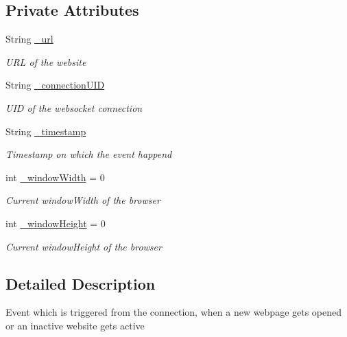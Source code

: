 \subsection*{Private Attributes}
\begin{DoxyCompactItemize}
\item 
String \hyperlink{class_web_analyzer_1_1_events_1_1_add_webpage_event_a514a144e2cc984ecec6593547732c55f}{\+\_\+url}
\begin{DoxyCompactList}\small\item\em U\+R\+L of the website \end{DoxyCompactList}\item 
String \hyperlink{class_web_analyzer_1_1_events_1_1_add_webpage_event_a20bc73ad665fa032bc1d2e7f6d34db17}{\+\_\+connection\+U\+I\+D}
\begin{DoxyCompactList}\small\item\em U\+I\+D of the websocket connection \end{DoxyCompactList}\item 
String \hyperlink{class_web_analyzer_1_1_events_1_1_add_webpage_event_a6e60058cdea0a0ac86687e1a50eae2ed}{\+\_\+timestamp}
\begin{DoxyCompactList}\small\item\em Timestamp on which the event happend \end{DoxyCompactList}\item 
int \hyperlink{class_web_analyzer_1_1_events_1_1_add_webpage_event_a81172683920ef969d84914baff51a87b}{\+\_\+window\+Width} = 0
\begin{DoxyCompactList}\small\item\em Current window\+Width of the browser \end{DoxyCompactList}\item 
int \hyperlink{class_web_analyzer_1_1_events_1_1_add_webpage_event_ad9982772f07111a104ab6a81d3704bb5}{\+\_\+window\+Height} = 0
\begin{DoxyCompactList}\small\item\em Current window\+Height of the browser \end{DoxyCompactList}\end{DoxyCompactItemize}


\subsection{Detailed Description}
Event which is triggered from the connection, when a new webpage gets opened or an inactive website gets active 



